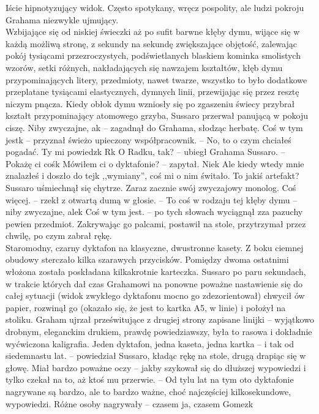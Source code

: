 \documentclass[../MAIN.tex]{subfiles}
\begin{document}
Iście hipnotyzujący widok. Często spotykany, wręcz pospolity, ale ludzi pokroju Grahama niezwykle ujmujący.\\
Wzbijające się od niskiej świeczki aż po sufit barwne kłęby dymu, wijące się w każdą możliwą stronę, z sekundy na sekundę zwiększające objętość, zalewając pokój tysiącami przezroczystych, podświetlanych blaskiem kominka smolistych wzorów, setki różnych, nakładających się nawzajem kształtów, kłęb dymu przypominających litery, przedmioty, nawet twarze, wszystko to było dodatkowe przeplatane tysiącami elastycznych, dymnych linii, przewijając się przez resztę niczym pnącza.
Kiedy obłok dymu wzniosły się po zgaszeniu świecy przybrał kształt przypominający atomowego grzyba, Sussaro przerwał panującą w pokoju ciszę.
\sx Niby zwyczajne, a\3k -- zagadnął do Grahama, słodząc herbatę.
\xx Coś w tym jest\3k -- przyznał świeżo upieczony współpracownik. -- No, to o czym chciałeś pogadać.
\xx Ty mi powiedz\3k
R\3k
\xx O Radku, tak? -- ubiegł Grahama Sussaro. -- Pokażę ci coś\3k Mówiłem ci o dyktafonie? -- zapytał.
\xx Nie\3k Ale kiedy wtedy mnie znalazłeś i doszło do tej\3k ,,wymiany'', coś mi o nim świtało. To jakiś artefakt?
\qd
Sussaro uśmiechnął się chytrze. Zaraz zacznie swój zwyczajowy monolog.
\sx Coś więcej. -- rzekł z otwartą dumą w głosie. -- To coś w rodzaju tej kłęby dymu -- niby zwyczajne, ale\3k Coś w tym jest. -- po tych słowach wyciągnął zza pazuchy pewien przedmiot.
\qd
Zakrywając go palcami, postawił na stole, przytrzymał przez chwilę, po czym zabrał rękę.\\
Staromodny, czarny dyktafon na klasyczne, dwustronne kasety. Z boku ciemnej obudowy sterczało kilka szarawych przycisków. Pomiędzy dwoma ostatnimi włożona została poskładana kilkakrotnie karteczka. Sussaro po paru sekundach, w trakcie których dał czas Grahamowi na ponowne poważne nastawienie się do całej sytuacji (widok zwykłego dyktafonu mocno go zdezorientował) chwycił ów papier, rozwinął go (okazało się, że jest to kartka A5, w linie) i położył na stoliku. Graham ujrzał prześwitujące z drugiej strony zapisane linijki -- wyjątkowo drobnym, eleganckim drukiem, prawdę powiedziawszy, była to rasowa i dokładnie wyćwiczona kaligrafia.
\sx Jeden dyktafon, jedna kaseta, jedna kartka -- i tak od siedemnastu lat. -- powiedział Sussaro, kładąc rękę na stole, drugą drapiąc się w głowę. Miał bardzo poważne oczy -- jakby szykował się do dłuższej wypowiedzi i tylko czekał na to, aż ktoś mu przerwie. -- Od tylu lat na tym oto dyktafonie nagrywane są bardzo, ale to bardzo ważne, choć najczęściej kilkosekundowe, wypowiedzi. Różne osoby nagrywały -- czasem ja, czasem Gomez\3k
\end{document}
